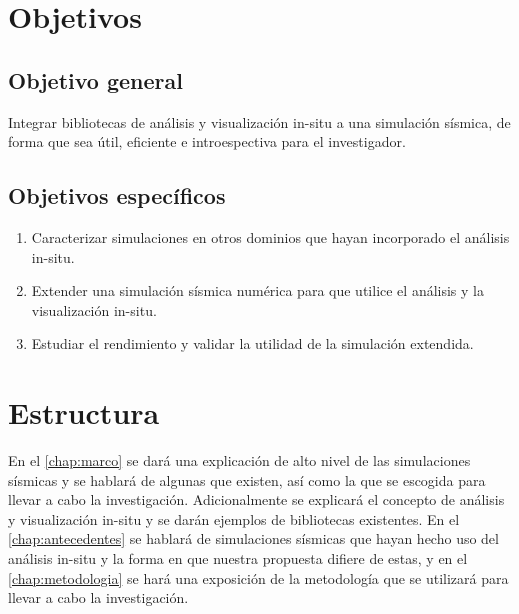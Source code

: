 \section{Objetivos}
\subsection{Objetivo general}
Integrar bibliotecas de análisis y visualización in-situ a una simulación sísmica, de forma que sea útil, eficiente e introespectiva para el investigador.
\subsection{Objetivos específicos}
\begin{enumerate}
  \item Caracterizar simulaciones en otros dominios que hayan incorporado el análisis in-situ. %
  \item Extender una simulación sísmica numérica para que utilice el análisis y la visualización in-situ. %
  \item Estudiar el rendimiento y validar la utilidad de la simulación extendida. %
\end{enumerate}
\section{Estructura}
En el \cref{chap:marco} se dará una explicación de alto nivel de las simulaciones sísmicas y se hablará de algunas que existen, así como la que se escogida para llevar a cabo la investigación. Adicionalmente se explicará el concepto de análisis y visualización in-situ y se darán ejemplos de bibliotecas existentes.
En el \cref{chap:antecedentes} se hablará de simulaciones sísmicas que hayan hecho uso del análisis in-situ y la forma en que nuestra propuesta difiere de estas, y en el \cref{chap:metodologia} se hará una exposición de la metodología que se utilizará para llevar a cabo la investigación.


